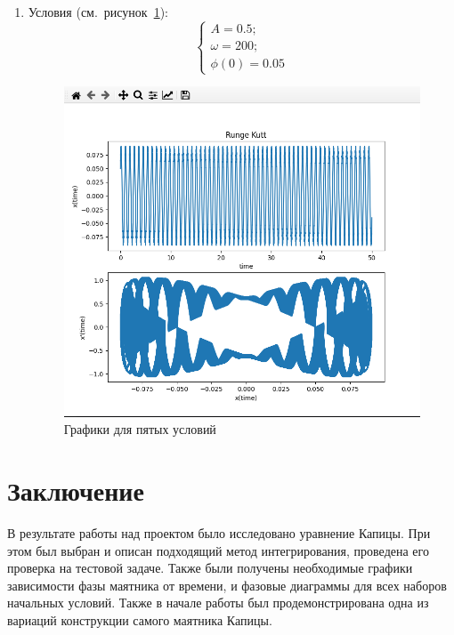 \documentclass[a4paper,12pt]{article}
\begin{document}
\begin{enumerate}
		\item Условия (см.~рисунок~\ref{fig:5_praq}):
		\begin{equation}
			\begin{cases}
				A = 0.5; \\
				\omega = 200; \\
				\phi(0) = 0.05
			\end{cases}
		\end{equation}
		\begin{figure}[ht!]
			\begin{center}
			\includegraphics[scale=0.3]{sources/5_praq.png}
			\end{center}
			\vspace*{-8mm}
			\caption{Графики для пятых условий}\label{fig:5_praq}
	  	\end{figure}

	\end{enumerate}


	\newpage
	
	\section{Заключение}

	В результате работы над проектом было исследовано уравнение Капицы. При
	этом был выбран и описан подходящий метод интегрирования, проведена его
	проверка на тестовой задаче. Также были получены необходимые графики 
	зависимости фазы маятника от времени, и фазовые диаграммы для всех 
	наборов начальных условий. Также в начале работы был продемонстрирована 
	одна из вариаций конструкции самого маятника Капицы.
\end{document}
